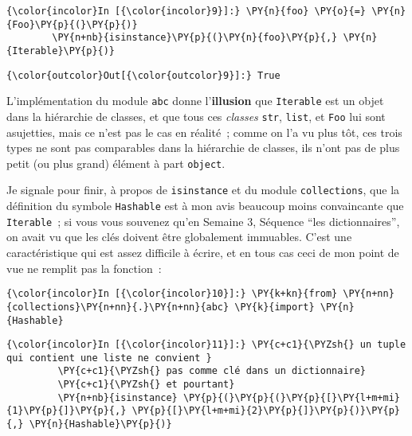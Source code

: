     \begin{Verbatim}[commandchars=\\\{\},frame=single,framerule=0.3mm,rulecolor=\color{cellframecolor}]
{\color{incolor}In [{\color{incolor}9}]:} \PY{n}{foo} \PY{o}{=} \PY{n}{Foo}\PY{p}{(}\PY{p}{)}
        \PY{n+nb}{isinstance}\PY{p}{(}\PY{n}{foo}\PY{p}{,} \PY{n}{Iterable}\PY{p}{)}
\end{Verbatim}


\begin{Verbatim}[commandchars=\\\{\},frame=single,framerule=0.3mm,rulecolor=\color{cellframecolor}]
{\color{outcolor}Out[{\color{outcolor}9}]:} True
\end{Verbatim}
            
    L'implémentation du module \texttt{abc} donne l'\textbf{illusion} que
\texttt{Iterable} est un objet dans la hiérarchie de classes, et que
tous ces \emph{classes} \texttt{str}, \texttt{list}, et \texttt{Foo} lui
sont asujetties, mais ce n'est pas le cas en réalité~; comme on l'a vu
plus tôt, ces trois types ne sont pas comparables dans la hiérarchie de
classes, ils n'ont pas de plus petit (ou plus grand) élément à part
\texttt{object}.

    Je signale pour finir, à propos de \texttt{isinstance} et du module
\texttt{collections}, que la définition du symbole \texttt{Hashable} est
à mon avis beaucoup moins convaincante que \texttt{Iterable}~; si vous
vous souvenez qu'en Semaine 3, Séquence ``les dictionnaires'', on avait
vu que les clés doivent être globalement immuables. C'est une
caractéristique qui est assez difficile à écrire, et en tous cas ceci de
mon point de vue ne remplit pas la fonction~:

    \begin{Verbatim}[commandchars=\\\{\},frame=single,framerule=0.3mm,rulecolor=\color{cellframecolor}]
{\color{incolor}In [{\color{incolor}10}]:} \PY{k+kn}{from} \PY{n+nn}{collections}\PY{n+nn}{.}\PY{n+nn}{abc} \PY{k}{import} \PY{n}{Hashable}
\end{Verbatim}


    \begin{Verbatim}[commandchars=\\\{\},frame=single,framerule=0.3mm,rulecolor=\color{cellframecolor}]
{\color{incolor}In [{\color{incolor}11}]:} \PY{c+c1}{\PYZsh{} un tuple qui contient une liste ne convient }
         \PY{c+c1}{\PYZsh{} pas comme clé dans un dictionnaire}
         \PY{c+c1}{\PYZsh{} et pourtant}
         \PY{n+nb}{isinstance} \PY{p}{(}\PY{p}{(}\PY{p}{[}\PY{l+m+mi}{1}\PY{p}{]}\PY{p}{,} \PY{p}{[}\PY{l+m+mi}{2}\PY{p}{]}\PY{p}{)}\PY{p}{,} \PY{n}{Hashable}\PY{p}{)}
\end{Verbatim}


